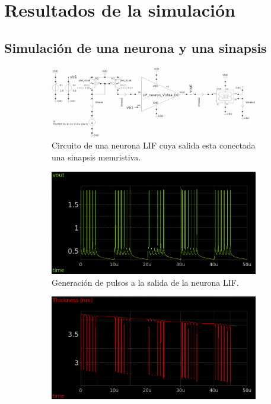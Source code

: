 \documentclass[conference]{IEEEtran}
\begin{document}
\section{Resultados de la simulación}
\subsection{Simulación de una neurona y una sinapsis}
\begin{figure}[htbp]
    \centering
    \begin{subfigure}[b]{0.45\textwidth}
        \centering
        \includegraphics[width=\textwidth]{img/1LIF.png}
        \caption{Circuito de una neurona LIF cuya salida esta conectada una sinapsis memristiva.}
        \label{fig:1LIF}
    \end{subfigure}
    \hfill
    \begin{subfigure}[b]{0.45\textwidth}
        \centering
        \includegraphics[width=\textwidth]{img/1LIF_V.png}
        \caption{Generación de pulsos a la salida de la neurona LIF.}
        \label{fig:1LIF_V}
    \end{subfigure}
    \hfill
    \begin{subfigure}[b]{0.45\textwidth}
        \centering
        \includegraphics[width=\textwidth]{img/1LIF_T.png}

\end{subfigure}
\end{figure}
\end{document}

